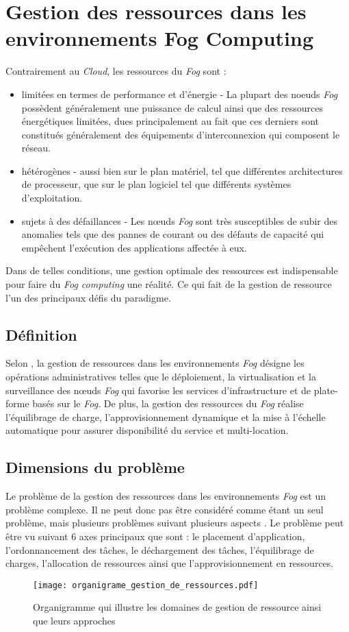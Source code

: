 \section{Gestion des ressources dans les environnements Fog Computing}
Contrairement au \emph{Cloud}, les ressources du \emph{Fog} sont : 
\begin{itemize}
  \item limitées en termes de performance et d'énergie - La plupart des noeuds \emph{Fog} possèdent généralement une  puissance de calcul ainsi que des ressources énergétiques limitées, dues principalement au fait que ces derniers sont constitués généralement des équipements d'interconnexion qui composent le réseau.
  \item hétérogènes - aussi bien sur le plan matériel, tel que différentes architectures de processeur, que sur le plan logiciel tel que différents systèmes d'exploitation.
  \item sujets à des défaillances - Les nœuds \emph{Fog} sont très susceptibles de subir des anomalies tels que des pannes de courant ou des défauts de capacité qui empêchent l'exécution des applications affectée à eux.
\end{itemize}
Dans de telles conditions, une gestion optimale des ressources est indispensable pour faire du \emph{Fog computing} une réalité. Ce qui fait de la gestion de ressource l'un des principaux défis du paradigme.

\subsection{Définition}
Selon \cite{red2020}, la gestion de ressources dans les environnements \emph{Fog} désigne \og{}les opérations administratives telles que le déploiement, la virtualisation et la surveillance des nœuds \emph{Fog} qui favorise les services d'infrastructure et de plate-forme basés sur le \emph{Fog}. De plus, la gestion des ressources du \emph{Fog} réalise l'équilibrage de charge, l'approvisionnement dynamique et la mise à l'échelle automatique pour assurer disponibilité du service et multi-location\fg{}.

\subsection{Dimensions du problème}
Le problème de la gestion des ressources dans les environnements \emph{Fog} est un problème complexe. Il ne peut donc pas être considéré comme étant un seul problème, mais plusieurs problèmes suivant plusieurs aspects \cite{mos2019}. Le problème peut être vu suivant  6 axes principaux que sont : le placement d'application, l'ordonnancement des tâches, le déchargement des tâches, l'équilibrage de charges, l'allocation de ressources ainsi que l'approvisionnement en ressources.
\begin{figure}[H]
  \centering
  \texttt{[image: organigrame\_gestion\_de\_ressources.pdf]}
  \caption{Organigramme qui illustre les domaines de gestion de ressource ainsi que leurs approches}
  \label{fig:organigrame_de_gestion_de_ressources}
\end{figure}

